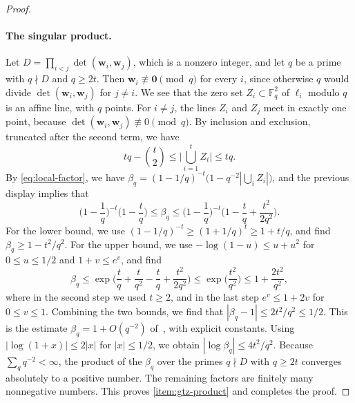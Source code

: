\documentclass[12pt,oneside,openany]{book}
\theoremstyle{definition}
\theoremstyle{plain}
\numberwithin{equation}{chapter}
\theoremstyle{plain}
\theoremstyle{definition}
\theoremstyle{remark}
\newcommand{\F}{\mathbb F}
\begin{document}
\begin{proof}
\paragraph{The singular product.} Let $D=\prod_{i<j}\det(\mathbf w_i,\mathbf w_j)$, which is a nonzero integer, and let $q$ be a prime with $q\nmid D$ and $q\ge2t$. Then $\mathbf w_i\not\equiv\mathbf 0\pmod q$ for every $i$, since otherwise $q$ would divide $\det(\mathbf w_i,\mathbf w_j)$ for $j\ne i$. We see that the zero set $Z_i\subset\F_q^2$ of $\ell_i$ modulo $q$ is an affine line, with $q$ points. For $i\ne j$, the lines $Z_i$ and $Z_j$ meet in exactly one point, because $\det(\mathbf w_i,\mathbf w_j)\not\equiv0\pmod q$. By inclusion and exclusion, truncated after the second term, we have
\[
tq-\binom t2\le\Big|\bigcup_{i=1}^tZ_i\Big|\le tq.
\]
By \eqref{eq:local-factor}, we have $\beta_q=(1-1/q)^{-t}\big(1-q^{-2}|\bigcup_iZ_i|\big)$, and the previous display implies that
\begin{equation}\label{eq:gtz-generic-factor}
\Big(1-\frac1q\Big)^{-t}\Big(1-\frac tq\Big)\le\beta_q\le\Big(1-\frac1q\Big)^{-t}\Big(1-\frac tq+\frac{t^2}{2q^2}\Big).
\end{equation}
For the lower bound, we use $(1-1/q)^{-t}\ge(1+1/q)^t\ge1+t/q$, and find $\beta_q\ge1-t^2/q^2$. For the upper bound, we use $-\log(1-u)\le u+u^2$ for $0\le u\le1/2$ and $1+v\le e^v$, and find
\[
\beta_q\le\exp\Big(\frac tq+\frac t{q^2}-\frac tq+\frac{t^2}{2q^2}\Big)\le\exp\Big(\frac{t^2}{q^2}\Big)\le1+\frac{2t^2}{q^2},
\]
where in the second step we used $t\ge2$, and in the last step $e^v\le1+2v$ for $0\le v\le1$. Combining the two bounds, we find that $|\beta_q-1|\le2t^2/q^2\le1/2$. This is the estimate $\beta_q=1+O(q^{-2})$ of~\cite[Lemma~1.3]{GT2010}, with explicit constants. Using $|\log(1+x)|\le2|x|$ for $|x|\le1/2$, we obtain $|\log\beta_q|\le4t^2/q^2$. Because $\sum_q q^{-2}<\infty$, the product of the $\beta_q$ over the primes $q\nmid D$ with $q\ge2t$ converges absolutely to a positive number. The remaining factors are finitely many nonnegative numbers. This proves \ref{item:gtz-product} and completes the proof.
\end{proof}
\end{document}
